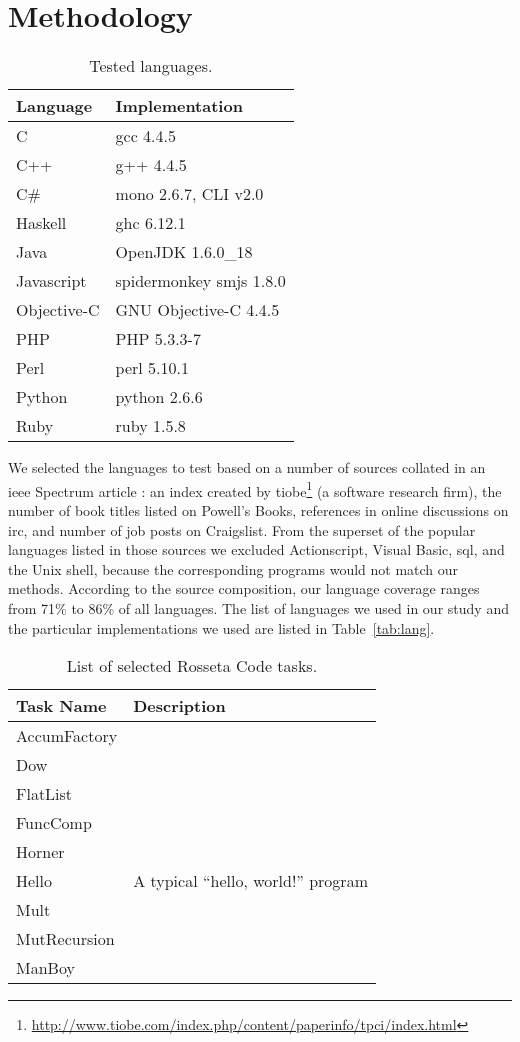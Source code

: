 \documentclass[10pt]{sigplanconf}
\begin{document}
\section{Methodology} %
\begin{table}
\begin{center}
\caption{Tested languages.}
\label{tab:langs}
\begin{tabular}{ l l}
 \hline
Language & Implementation \\
\hline
C 		& gcc 4.4.5 \\
C++ 		& g++ 4.4.5 \\
C\# 		& mono 2.6.7, CLI v2.0 \\
Haskell 	& ghc 6.12.1 \\
Java 		& OpenJDK 1.6.0\_18 \\
Javascript 	& spidermonkey smjs 1.8.0 \\
Objective-C 	& GNU Objective-C 4.4.5 \\
PHP 		& PHP 5.3.3-7 \\
Perl 		& perl 5.10.1 \\
Python 		& python 2.6.6 \\
Ruby 		& ruby 1.5.8 \\
\hline
\end{tabular}
\end{center}
\end{table}

We selected the languages to test based on a number of sources
collated in an {\sc ieee} Spectrum article \cite{Kin11}:
an index created by
{\sc tiobe}\footnote{\url{http://www.tiobe.com/index.php/content/paperinfo/tpci/index.html}} (a software research firm),
the number of book titles listed on Powell's Books,
references in online discussions on {\sc irc}, and
number of job posts on Craigslist.
From the superset of the popular languages listed in those
sources we excluded
Actionscript, Visual Basic, {\sc sql}, and the Unix shell,
because the corresponding programs would not match our methods.
According to the source composition,
our language coverage ranges from 71\% to 86\% of all languages.
The list of languages we used in our study and the
particular implementations we used are listed in
Table~\ref{tab:lang}.

\begin{table}
\begin{center}
\caption{List of selected Rosseta Code tasks.}
\label{tab:Tasks}
\begin{tabular}{ l p{4cm}}
 \hline
Task Name & Description\\
\hline
AccumFactory & \\
Dow & \\
FlatList & \\
FuncComp & \\
Horner & \\
Hello & A typical ``hello, world!'' program\\
Mult & \\
MutRecursion & \\
ManBoy & \\
\hline
\end{tabular}
\end{center}
\end{table}
\end{document}
